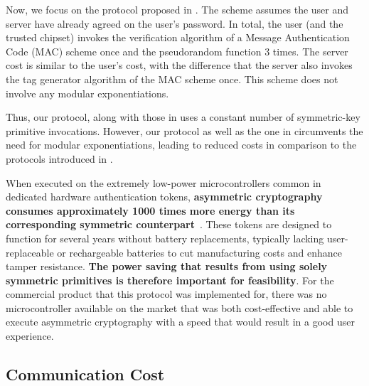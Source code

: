 Now, we focus on the protocol proposed in \cite{MatsuoMY11}. The scheme assumes the user and server have already agreed on the user's password. 
%
In total, the user (and the trusted chipset) invokes the verification algorithm of a Message Authentication Code (MAC) scheme once and the pseudorandom function $3$ times. The server cost is similar to the user's cost, with the difference that the server also invokes the tag generator algorithm of the MAC scheme once. This scheme does not involve any modular exponentiations. 

Thus,  our protocol, along with those in \cite{WangW18,JareckiJKSS21,MatsuoMY11} uses a constant number of symmetric-key primitive invocations. However, our protocol as well as the one in \cite{MatsuoMY11} circumvents the need for modular exponentiations, leading to reduced costs in comparison to the protocols introduced in  \cite{WangW18,JareckiJKSS21}.

When executed on the extremely low-power microcontrollers common in dedicated hardware authentication tokens, \textbf{asymmetric cryptography consumes approximately 1000 times more energy than its corresponding symmetric counterpart}~\cite{energyconsumption}. These tokens are designed to function for several years without battery replacements, typically lacking user-replaceable or rechargeable batteries to cut manufacturing costs and enhance tamper resistance. \textbf{The power saving that results from using solely symmetric primitives is therefore important for feasibility}. 
%
For the commercial product that this protocol was implemented for, there was no microcontroller available on the market that was both cost-effective and able to execute asymmetric cryptography with a speed that would result in a good user experience.







\vspace{-1.8mm}
\subsection{Communication Cost}
\vspace{-.3mm}

